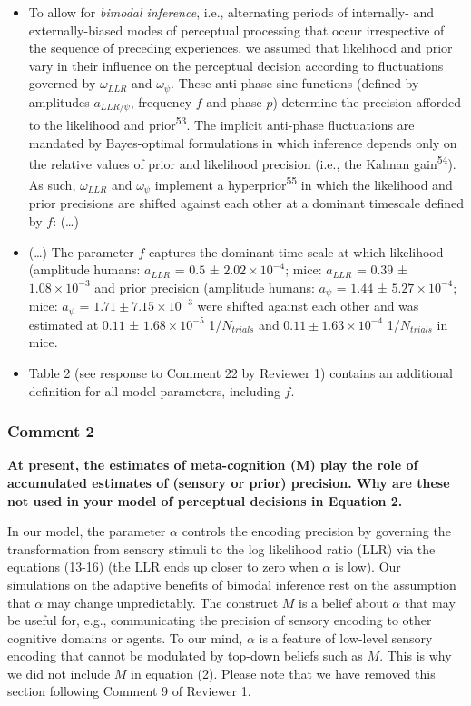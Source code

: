 \documentclass[
]{article}
\begin{document}
\begin{itemize}
\item
  To allow for \emph{bimodal inference}, i.e., alternating periods of
  internally- and externally-biased modes of perceptual processing that
  occur irrespective of the sequence of preceding experiences, we
  assumed that likelihood and prior vary in their influence on the
  perceptual decision according to fluctuations governed by
  \(\omega_{LLR}\) and \(\omega_{\psi}\). These anti-phase sine
  functions (defined by amplitudes \(a_{LLR/\psi}\), frequency \(f\) and
  phase \(p\)) determine the precision afforded to the likelihood and
  prior\textsuperscript{53}. The implicit anti-phase fluctuations are
  mandated by Bayes-optimal formulations in which inference depends only
  on the relative values of prior and likelihood precision (i.e., the
  Kalman gain\textsuperscript{54}). As such, \(\omega_{LLR}\) and
  \(\omega_{\psi}\) implement a hyperprior\textsuperscript{55} in which
  the likelihood and prior precisions are shifted against each other at
  a dominant timescale defined by \(f\): (\ldots)
\item
  (\ldots) The parameter \(f\) captures the dominant time scale at which
  likelihood (amplitude humans: \(a_{LLR}\) = \(0.5\) ±
  \(\ensuremath{2.02\times 10^{-4}}\); mice: \(a_{LLR}\) = \(0.39\) ±
  \(\ensuremath{1.08\times 10^{-3}}\) and prior precision (amplitude
  humans: \(a_{\psi}\) = \(1.44\) ± \(\ensuremath{5.27\times 10^{-4}}\);
  mice: \(a_{\psi}\) = \(1.71 ± \ensuremath{7.15\times 10^{-3}}\) were
  shifted against each other and was estimated at \(0.11\) ±
  \(\ensuremath{1.68\times 10^{-5}}\) 1/\(N_{trials}\) and
  \(0.11 ± \ensuremath{1.63\times 10^{-4}}\) 1/\(N_{trials}\) in mice.
\item
  Table 2 (see response to Comment 22 by Reviewer 1) contains an
  additional definition for all model parameters, including \(f\).
\end{itemize}

\hypertarget{comment-2}{%
\subsubsection{Comment 2}\label{comment-2}}

\textbf{At present, the estimates of meta-cognition (M) play the role of
accumulated estimates of (sensory or prior) precision. Why are these not
used in your model of perceptual decisions in Equation 2.}

In our model, the parameter \(\alpha\) controls the encoding precision
by governing the transformation from sensory stimuli to the log
likelihood ratio (LLR) via the equations (13-16) (the LLR ends up closer
to zero when \(\alpha\) is low). Our simulations on the adaptive
benefits of bimodal inference rest on the assumption that \(\alpha\) may
change unpredictably. The construct \(M\) is a belief about \(\alpha\)
that may be useful for, e.g., communicating the precision of sensory
encoding to other cognitive domains or agents. To our mind, \(\alpha\)
is a feature of low-level sensory encoding that cannot be modulated by
top-down beliefs such as \(M\). This is why we did not include \(M\) in
equation (2). Please note that we have removed this section following
Comment 9 of Reviewer 1.
\end{document}

